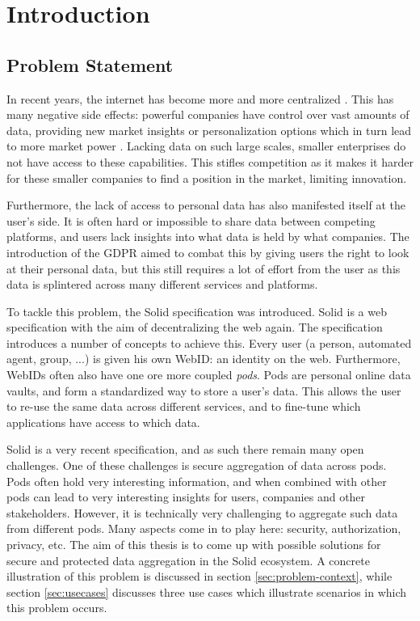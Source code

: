 \chapter{Introduction}
\label{cha:intro}

\section{Problem Statement}
\label{sec:problem}
In recent years, the internet has become more and more centralized \citep{internet-report}. This has many negative side effects: powerful companies have control over vast amounts of data, providing new market insights or personalization options which in turn lead to more market power \citep{big-tech-innovation, platform-monopolies}. Lacking data on such large scales, smaller enterprises do not have access to these capabilities. This stifles competition as it makes it harder for these smaller companies to find a position in the market, limiting innovation. 

Furthermore, the lack of access to personal data has also manifested itself at the user's side. It is often hard or impossible to share data between competing platforms, and users lack insights into what data is held by what companies. The introduction of the \gls{GDPR} \citep{GDPR} aimed to combat this by giving users the right to look at their personal data, but this still requires a lot of effort from the user as this data is splintered across many different services and platforms. 

To tackle this problem, the Solid \citep{solid} specification was introduced. Solid is a web specification with the aim of decentralizing the web again. The specification introduces a number of concepts to achieve this. Every user (a person, automated agent, group, ...) is given his own WebID: an identity on the web. Furthermore, WebIDs often also have one ore more coupled \textit{pods}. Pods are personal online data vaults, and form a standardized way to store a user's data. This allows the user to re-use the same data across different services, and to fine-tune which applications have access to which data.

Solid is a very recent specification, and as such there remain many open challenges. One of these challenges is secure aggregation of data across pods. Pods often hold very interesting information, and when combined with other pods can lead to very interesting insights for users, companies and other stakeholders. However, it is technically very challenging to aggregate such data from different pods. Many aspects come in to play here: security, authorization, privacy, etc. The aim of this thesis is to come up with possible solutions for secure and protected data aggregation in the Solid ecosystem. A concrete illustration of this problem is discussed in section \ref{sec:problem-context}, while section \ref{sec:usecases} discusses three use cases which illustrate scenarios in which this problem occurs.

